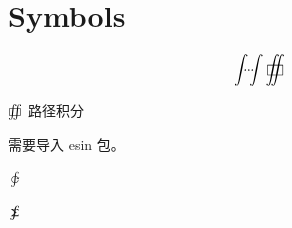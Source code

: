 \section*{Symbols}

\[
\idotsint
\sqiint
\]

\( \sqiint \) 路径积分 \par
需要导入 esin 包。

\( \varointclockwise \) \par
\( \sumint \)

